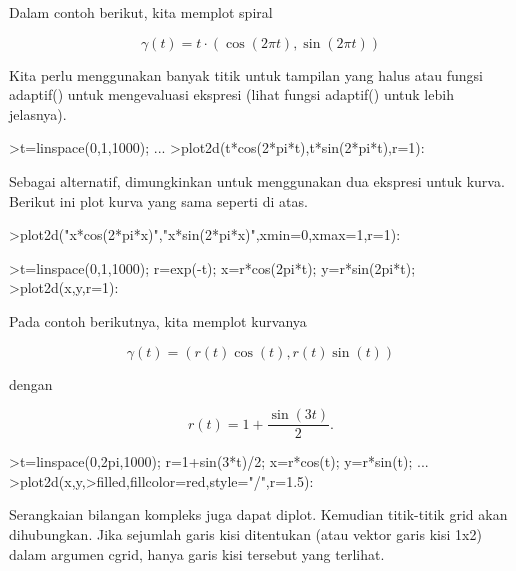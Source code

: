 \documentclass[a4paper,10pt]{article}
\begin{document}
\begin{eulernotebook}
\begin{eulercomment}
\begin{eulercomment}
\begin{eulercomment}
\begin{eulercomment}
\begin{eulercomment}
Dalam contoh berikut, kita memplot spiral

\end{eulercomment}
\begin{eulerformula}
\[
\gamma(t) = t \cdot (\cos(2\pi t),\sin(2\pi t))
\]
\end{eulerformula}
\begin{eulercomment}
Kita perlu menggunakan banyak titik untuk tampilan yang halus atau
fungsi adaptif() untuk mengevaluasi ekspresi (lihat fungsi adaptif()
untuk lebih jelasnya).
\end{eulercomment}
\begin{eulerprompt}
>t=linspace(0,1,1000); ...
>plot2d(t*cos(2*pi*t),t*sin(2*pi*t),r=1):
\end{eulerprompt}
\begin{eulercomment}
Sebagai alternatif, dimungkinkan untuk menggunakan dua ekspresi untuk
kurva. Berikut ini plot kurva yang sama seperti di atas.
\end{eulercomment}
\begin{eulerprompt}
>plot2d("x*cos(2*pi*x)","x*sin(2*pi*x)",xmin=0,xmax=1,r=1):
\end{eulerprompt}
\begin{eulerprompt}
>t=linspace(0,1,1000); r=exp(-t); x=r*cos(2pi*t); y=r*sin(2pi*t);
>plot2d(x,y,r=1):
\end{eulerprompt}
\begin{eulercomment}
Pada contoh berikutnya, kita memplot kurvanya

\end{eulercomment}
\begin{eulerformula}
\[
\gamma(t) = (r(t) \cos(t), r(t) \sin(t))
\]
\end{eulerformula}
\begin{eulercomment}
dengan

\end{eulercomment}
\begin{eulerformula}
\[
r(t) = 1 + \dfrac{\sin(3t)}{2}.
\]
\end{eulerformula}
\begin{eulerprompt}
>t=linspace(0,2pi,1000); r=1+sin(3*t)/2; x=r*cos(t); y=r*sin(t); ...
>plot2d(x,y,>filled,fillcolor=red,style="/",r=1.5):
\end{eulerprompt}
\begin{eulercomment}
Serangkaian bilangan kompleks juga dapat diplot. Kemudian titik-titik
grid akan dihubungkan. Jika sejumlah garis kisi ditentukan (atau
vektor garis kisi 1x2) dalam argumen cgrid, hanya garis kisi tersebut
yang terlihat.


\end{eulercomment}
\end{eulercomment}
\end{eulercomment}
\end{eulercomment}
\end{eulercomment}
\end{eulernotebook}
\end{document}
